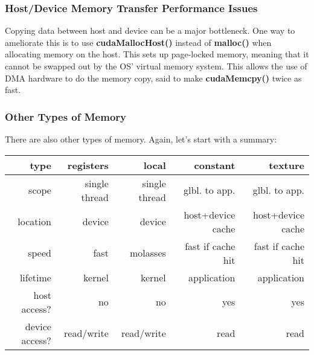 \subsubsection{Host/Device Memory Transfer Performance Issues}

Copying data between host and device can be a major bottleneck.  One way
to ameliorate this is to use {\bf cudaMallocHost()} instead of {\bf
malloc()} when allocating memory on the host.  This sets up page-locked
memory, meaning that it cannot be swapped out by the OS' virtual memory
system.  This allows the use of DMA hardware to do the memory copy, 
said to make {\bf cudaMemcpy()} twice as fast.

\subsubsection{Other Types of Memory}
\label{othermems}

There are also other types of memory.  Again, let's start with a
summary:

\begin{tabular}{|r|r|r|r|r|}
\hline
type & registers & local & constant & texture \\ \hline 
\hline
scope & single thread & single thread & glbl. to app. & glbl. to app.\\ \hline 
location & device & device & host+device cache & host+device cache\\ \hline 
speed & fast & molasses & fast if cache hit & fast if cache hit \\ \hline
lifetime & kernel & kernel & application & application \\ \hline 
host access? & no & no & yes & yes \\ \hline 
device access? & read/write & read/write & read & read \\ \hline 
\end{tabular}


